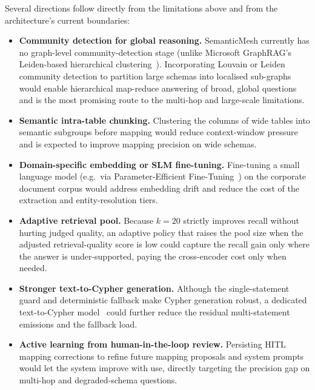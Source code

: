 Several directions follow directly from the limitations above and from the architecture's current boundaries:
\begin{itemize}
    \item \textbf{Community detection for global reasoning.} SemanticMesh currently has no graph-level community-detection stage (unlike Microsoft GraphRAG's Leiden-based hierarchical clustering~\cite{blondel2008fast, traag2019from}). Incorporating Louvain or Leiden community detection to partition large schemas into localised sub-graphs would enable hierarchical map-reduce answering of broad, global questions and is the most promising route to the multi-hop and large-scale limitations.
    \item \textbf{Semantic intra-table chunking.} Clustering the columns of wide tables into semantic subgroups before mapping would reduce context-window pressure and is expected to improve mapping precision on wide schemas.
    \item \textbf{Domain-specific embedding or SLM fine-tuning.} Fine-tuning a small language model (e.g.\ via Parameter-Efficient Fine-Tuning~\cite{hu2022lora}) on the corporate document corpus would address embedding drift and reduce the cost of the extraction and entity-resolution tiers.
    \item \textbf{Adaptive retrieval pool.} Because $k{=}20$ strictly improves recall without hurting judged quality, an adaptive policy that raises the pool size when the adjusted retrieval-quality score is low could capture the recall gain only where the answer is under-supported, paying the cross-encoder cost only when needed.
    \item \textbf{Stronger text-to-Cypher generation.} Although the single-statement guard and deterministic fallback make Cypher generation robust, a dedicated text-to-Cypher model~\cite{tiwari2025autocypherimprovingllmscypher} could further reduce the residual multi-statement emissions and the fallback load.
    \item \textbf{Active learning from human-in-the-loop review.} Persisting HITL mapping corrections to refine future mapping proposals and system prompts would let the system improve with use, directly targeting the precision gap on multi-hop and degraded-schema questions.
\end{itemize}
